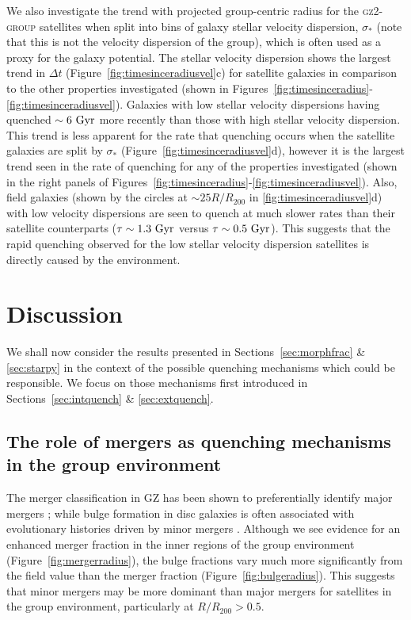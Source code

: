 \documentclass[useAMS,usenatbib]{mn2e}
\begin{document}
We also investigate the trend with projected group-centric radius for the \textsc{gz2-group} satellites when split into bins of galaxy stellar velocity dispersion, $\sigma_*$ (note that this is not the velocity dispersion of the group), which is often used as a proxy for the galaxy potential. The stellar velocity dispersion shows the largest trend in $\Delta t$ (Figure~\ref{fig:timesinceradiusvel}c) for satellite galaxies in comparison to the other properties investigated (shown in Figures~\ref{fig:timesinceradius}-\ref{fig:timesinceradiusvel}). Galaxies with low stellar velocity dispersions having quenched $\sim6~\rm{Gyr}$ more recently than those with high stellar velocity dispersion. This trend is less apparent for the rate that quenching occurs when the satellite galaxies are split by $\sigma_*$ (Figure~\ref{fig:timesinceradiusvel}d), however it is the largest trend seen in the rate of quenching for any of the properties investigated (shown in the right panels of Figures~\ref{fig:timesinceradius}-\ref{fig:timesinceradiusvel}). Also, field galaxies (shown by the circles at $\sim 25 R/R_{200}$ in \ref{fig:timesinceradiusvel}d) with low velocity dispersions are seen to quench at much slower rates than their satellite counterparts ($\tau\sim1.3~\rm{Gyr}$ versus $\tau\sim0.5~\rm{Gyr}$). This suggests that the rapid quenching observed for the low stellar velocity dispersion satellites is directly caused by the environment. 


\section{Discussion}\label{sec:disc}

We shall now consider the results presented in Sections~\ref{sec:morphfrac} \& \ref{sec:starpy} in the context of the possible quenching mechanisms which could be responsible. We focus on those mechanisms first introduced in Sections~\ref{sec:intquench} \& \ref{sec:extquench}. 

\subsection{The role of mergers as quenching mechanisms in the group environment}\label{sec:rolemergerenv}

The merger classification in GZ has been shown to preferentially identify major mergers \citep{Darg10a, casteels13}; while bulge formation in disc galaxies is often associated with evolutionary histories driven by minor mergers \citep{Croton06, tonini16}.  Although we see evidence for an enhanced merger fraction in the inner regions of the group environment (Figure~\ref{fig:mergerradius}), the bulge fractions vary much more significantly from the field value than the merger fraction (Figure~\ref{fig:bulgeradius}). This suggests that minor mergers may be more dominant than major mergers for satellites in the group environment, particularly at $R/R_{200} > 0.5$. 
\end{document}
